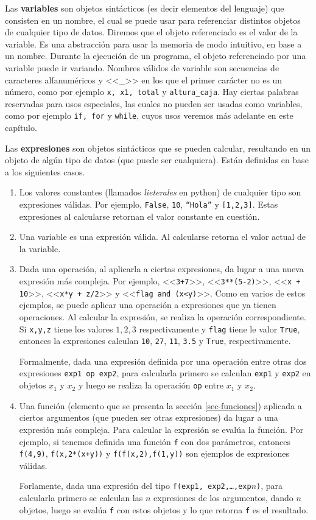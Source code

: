 \documentclass[a4paper, 12pt]{report}
\theoremstyle{definition}
\begin{document}
Las {\bf variables} son objetos sintácticos (es decir elementos del lenguaje) que consisten en un nombre, el cual se puede usar para referenciar distintos objetos de cualquier tipo de datos. Diremos que el objeto referenciado es el valor de la variable. Es una abstracción para usar la memoria de modo intuitivo, en base a un nombre. Durante la ejecución de un programa, el objeto referenciado por una variable puede ir variando. Nombres válidos de variable son secuencias de caracteres alfanuméricos y <<\_>> en los que el primer carácter no es un número, como por ejemplo {\tt x, x1, total} y {\tt altura\_caja}. Hay ciertas palabras reservadas para usos especiales, las cuales no pueden ser usadas como variables, como por ejemplo {\tt if, for} y {\tt while}, cuyos usos veremos más adelante en este capítulo.

Las {\bf expresiones} son objetos sintácticos que se pueden calcular, resultando en un objeto de algún tipo de datos (que puede ser cualquiera). Están definidas en base a los siguientes casos.
\begin{enumerate}
	\item Los valores constantes (llamados {\sl lieterales} en python) de cualquier tipo son expresiones válidas. Por ejemplo, {\tt False}, {\tt 10}, {\tt ``Hola''} y {\tt[1,2,3]}. Estas expresiones al calcularse retornan el valor constante en cuestión.
	\item Una variable es una expresión válida. Al calcularse retorna el valor actual de la variable.
	\item Dada una operación, al aplicarla a ciertas expresiones, da lugar a una nueva expresión más compleja. Por ejemplo, <<{\tt 3+7}>>, <<{\tt 3**(5-2)}>>, <<{\tt x + 10}>>, <<{\tt x*y + z/2}>> y <<{\tt flag and (x<y)}>>. Como en varios de estos ejemplos, se puede aplicar una operación a expresiones que ya tienen operaciones. Al calcular la expresión, se realiza la operación correspondiente. Si {\tt x,y,z} tiene los valores $1,2,3$ respectivamente y {\tt flag} tiene le valor {\tt True}, entonces la expresiones calculan {\tt 10}, {\tt 27}, {\tt 11}, {\tt 3.5} y {\tt True}, respectivamente.
	
	Formalmente, dada una expresión definida por una operación entre otras dos expresiones {\tt exp1 op exp2}, para calcularla primero se calculan {\tt exp1} y {\tt exp2} en objetos $x_1$ y $x_2$ y luego se realiza la operación {\tt op} entre $x_1$ y $x_2$.
	
	\item Una función (elemento que se presenta la sección \ref{sec-funciones}) aplicada a ciertos argumentos (que pueden ser otras expresiones) da lugar a una expresión más compleja. Para calcular la expresión se evalúa la función. Por ejemplo, si tenemos definida una función {\tt f} con dos parámetros, entonces  {\tt f(4,9)}, {\tt f(x,2*(x+y))} y {\tt f(f(x,2),f(1,y))} son ejemplos de expresiones válidas.
	
	Forlamente, dada una expresión del tipo {\tt f(exp1, exp2,\dots,exp$n$)}, para calcularla primero se calculan las $n$ expresiones de los argumentos, dando $n$ objetos, luego se evalúa {\tt f} con estos objetos y lo que retorna {\tt f} es el resultado.
\end{enumerate}
\end{document}
